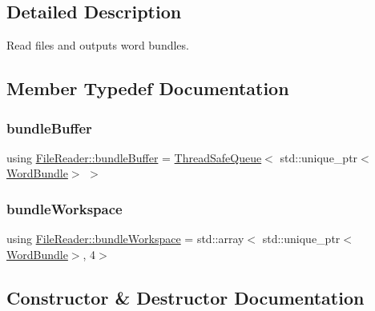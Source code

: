 \subsection{Detailed Description}
Read files and outputs word bundles. 

\subsection{Member Typedef Documentation}
\mbox{\label{class_file_reader_ac755c1e271610c2c12a7fc5b55cc048b}} 
\subsubsection{\texorpdfstring{bundle\+Buffer}{bundleBuffer}}
{\footnotesize\ttfamily using \hyperlink{class_file_reader_ac755c1e271610c2c12a7fc5b55cc048b}{File\+Reader\+::bundle\+Buffer} =  \hyperlink{class_thread_safe_queue}{Thread\+Safe\+Queue}$<$ std\+::unique\+\_\+ptr$<$\hyperlink{class_word_bundle}{Word\+Bundle}$>$ $>$\hspace{0.3cm}{\ttfamily [private]}}

\mbox{\label{class_file_reader_a7fb625dc45cee3256d37cc19c65cad86}} 
\subsubsection{\texorpdfstring{bundle\+Workspace}{bundleWorkspace}}
{\footnotesize\ttfamily using \hyperlink{class_file_reader_a7fb625dc45cee3256d37cc19c65cad86}{File\+Reader\+::bundle\+Workspace} =  std\+::array$<$ std\+::unique\+\_\+ptr$<$\hyperlink{class_word_bundle}{Word\+Bundle}$>$, 4$>$\hspace{0.3cm}{\ttfamily [private]}}



\subsection{Constructor \& Destructor Documentation}
\mbox{\label{class_file_reader_a3be44012f3dc81ad7943b1012b64e52d}} 
